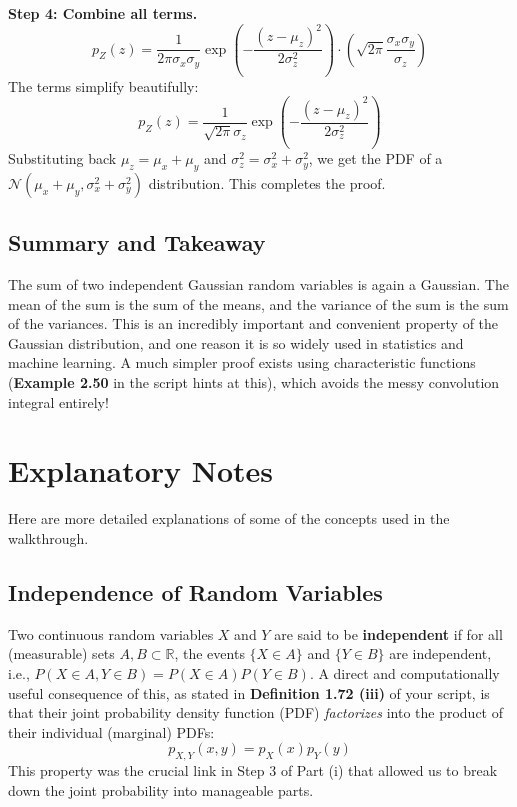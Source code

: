 \documentclass[11pt,a4paper]{article}
\begin{document}
\noindent\textbf{Step 4: Combine all terms.}
\[
p_Z(z) = \frac{1}{2\pi\sigma_x\sigma_y} \exp\left(-\frac{(z-\mu_z)^2}{2\sigma_z^2}\right) \cdot \left(\sqrt{2\pi} \frac{\sigma_x\sigma_y}{\sigma_z}\right)
\]
The terms simplify beautifully:
\[
p_Z(z) = \frac{1}{\sqrt{2\pi}\sigma_z} \exp\left(-\frac{(z-\mu_z)^2}{2\sigma_z^2}\right)
\]
Substituting back $\mu_z = \mu_x+\mu_y$ and $\sigma_z^2 = \sigma_x^2+\sigma_y^2$, we get the PDF of a $\mathcal{N}(\mu_x+\mu_y, \sigma_x^2+\sigma_y^2)$ distribution. This completes the proof.

\subsection{Summary and Takeaway}
The sum of two independent Gaussian random variables is again a Gaussian. The mean of the sum is the sum of the means, and the variance of the sum is the sum of the variances. This is an incredibly important and convenient property of the Gaussian distribution, and one reason it is so widely used in statistics and machine learning. A much simpler proof exists using characteristic functions (\textbf{Example 2.50} in the script hints at this), which avoids the messy convolution integral entirely!

\newpage
\section{Explanatory Notes}
Here are more detailed explanations of some of the concepts used in the walkthrough.

\subsection{Independence of Random Variables} \label{note_independence}
Two continuous random variables $X$ and $Y$ are said to be \textbf{independent} if for all (measurable) sets $A, B \subset \mathbb{R}$, the events $\{X \in A\}$ and $\{Y \in B\}$ are independent, i.e., $P(X \in A, Y \in B) = P(X \in A)P(Y \in B)$.
A direct and computationally useful consequence of this, as stated in \textbf{Definition 1.72 (iii)} of your script, is that their joint probability density function (PDF) \textit{factorizes} into the product of their individual (marginal) PDFs:
\[ p_{X,Y}(x,y) = p_X(x) p_Y(y) \]
This property was the crucial link in Step 3 of Part (i) that allowed us to break down the joint probability into manageable parts.
\end{document}
